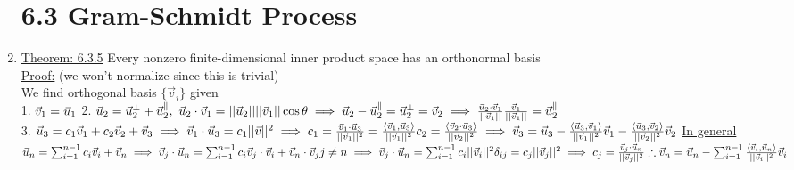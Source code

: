 \documentclass[12pt]{amsart}
\begin{document}
\begin{enumerate}
\section{6.3 Gram-Schmidt Process}
\item \underline{Theorem: 6.3.5} Every nonzero finite-dimensional inner product space has an orthonormal basis\\
\underline{Proof:} (we won't normalize since this is trivial)\\
We find orthogonal basis $\{ \vec{v}_i \}$ given \\
1. $\vec{v}_1 = \vec{u}_1\\$
2. $\vec{u}_2 = \vec{u}_2^{\perp} + \vec{u}_2^{\parallel},\,\, \vec{u}_2 \cdot \vec{v}_1 = || \vec{u}_2 || || \vec{v}_1 || \cos \theta\\
\implies \vec{u}_2 - \vec{u}_2^{\parallel} = \vec{u}_2^{\perp} = \vec{v}_2 \implies \frac{\vec{u}_2 \cdot \vec{v}_1}{|| \vec{v}_1 || } \frac{\vec{v}_1}{||\vec{v}_1||} = \vec{u}_2^{\parallel}$\\
3. $\vec{u}_3 = c_1 \vec{v}_1 + c_2 \vec{v}_2 + \vec{v}_3\\
\implies \vec{v}_1 \cdot \vec{u}_3 = c_1 || \vec{v}||^2\\
\implies c_1 = \frac{\vec{v}_1 \cdot \vec{u}_3}{|| \vec{v}_1||^2} = \frac{\langle \vec{v}_1, \vec{u}_3 \rangle}{||\vec{v}_1 ||^2}\\
c_2 = \frac{\langle \vec{v}_2 \cdot \vec{u}_3 \rangle}{|| \vec{v}_2 ||^2}\\
\implies \vec{v}_3 = \vec{u}_3 - \frac{\langle \vec{u}_3, \vec{v}_1 \rangle}{|| \vec{v}_1 ||^2} \vec{v}_1 - \frac{\langle \vec{u}_3, \vec{v}_2 \rangle}{|| \vec{v}_2||^2} \vec{v}_2\\$
\underline{In general}\\
$\vec{u}_n = \sum_{i=1}^{n-1} c_i \vec{v}_i + \vec{v}_n\\
\implies \vec{v}_j \cdot \vec{u}_n = \sum_{i=1}^{n-1} c_i \vec{v}_j \cdot \vec{v}_i + \vec{v}_n \cdot \vec{v}_j\\
j \neq n\\
\implies \vec{v}_j \cdot \vec{u}_n = \sum_{i=1}^{n-1} c_i || \vec{v}_i ||^2 \delta_{ij} = c_j || \vec{v}_j ||^2\\
\implies c_j = \frac{\vec{v}_j \cdot \vec{u}_n}{|| \vec{v}_j ||^2}\\
\therefore \vec{v}_n = \vec{u}_n - \sum_{i=1}^{n-1} \frac{\langle \vec{v}_i, \vec{u}_n \rangle}{|| \vec{v}_i ||^2} \vec{v}_i\\$



\end{enumerate}
\end{document}
